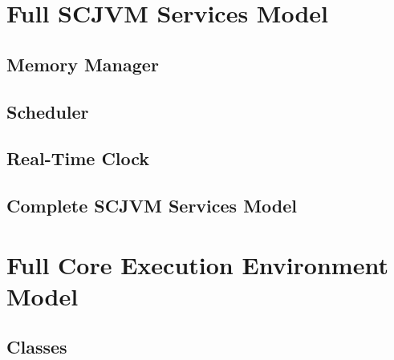 \documentclass[a4paper,11pt]{report}
\newif\ifFullModel
\newcommand{\IfFullModel}[1]{\ifFullModel #1 \fi}
\newcommand{\IfNotFullModel}[1]{\ifFullModel \else #1 \fi}
\begin{document}
\begin{refsection}















{\raggedright \printbibliography}

\appendix

\chapter{Full SCJVM Services Model}
\label{full-scjvm-services-model}

\FullModeltrue

\section{Memory Manager}


\section{Scheduler}


\section{Real-Time Clock}


\section{Complete SCJVM Services Model}


\chapter{Full Core Execution Environment Model}
\label{full-cee-model}

\section{Classes}



\end{refsection}
\end{document}
